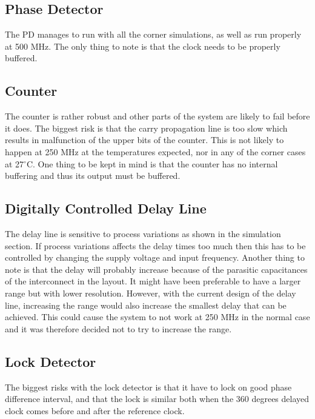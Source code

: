 \documentclass[a4paper,12pt]{article} \usepackage{graphicx}
\newcommand{\degree}{\ensuremath{^\circ}}
\begin{document}
\subsection{Phase Detector}
The PD manages to run with all the corner simulations, as well as run properly
at 500 MHz. The only thing to note is that the clock needs to be properly buffered.

\subsection{Counter}
The counter is rather robust and other parts of the system are likely to fail before
it does. The biggest risk is that the carry propagation line is too slow which results
in malfunction of the upper bits of the counter. This is not likely to happen at 250 
MHz at the temperatures expected, nor in any of the corner cases at 27$\degree$C.
One thing to be kept in mind is that the counter has no internal buffering and thus
its output must be buffered.


\subsection{Digitally Controlled Delay Line}
The delay line is sensitive to process variations as shown in the simulation
section. If process variations affects the delay times too much then this has to
be controlled by changing the supply voltage and input frequency. Another thing
to note is that the delay will probably increase because of the parasitic capacitances of
the interconnect in the layout. It might have been preferable to have a larger
range but with lower resolution. However, with the current design of the delay
line, increasing the range would also increase the smallest delay that can be
achieved. This could cause the system to not work at 250 MHz in the normal case
and it was therefore decided not to try to increase the range. 
\subsection{Lock Detector}
The biggest risks with the lock detector is that it have to lock on
good phase difference interval, and that the lock is similar both when
the 360 degrees delayed clock comes before and after the reference
clock. 
\end{document}
